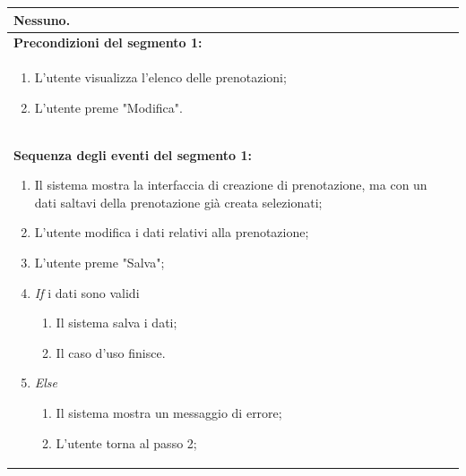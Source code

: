 \documentclass{article}
\begin{document}
\begin{table}[t]
\begin{tabular}{|p{\linewidth}|}
                        Nessuno. \\
                        \hline
                        \cellcolor{gray!20}
                        \textbf{Precondizioni del segmento 1:} \\
                        \cellcolor{gray!20}
                        \begin{minipage}{\linewidth}
                            \begin{enumerate}[noitemsep]
                                \item L'utente visualizza l'elenco delle prenotazioni;
                                \item L'utente preme "Modifica".
                            \end{enumerate}
                        \end{minipage}
                        \vspace{-5pt} \\
                        \hline
                        \textbf{Sequenza degli eventi del segmento 1:}
                        \begin{enumerate}
                            \item Il sistema mostra la interfaccia di creazione di prenotazione, ma con un dati saltavi della prenotazione già creata selezionati; %
                            \item L'utente modifica i dati relativi alla prenotazione;
                            \item L'utente preme "Salva";
                            \item \textit{If} i dati sono validi
                            \begin{enumerate}
                                \item Il sistema salva i dati;
                                \item Il caso d'uso finisce.
                            \end{enumerate}
                            \item \textit{Else}
                            \begin{enumerate}
                                \item Il sistema mostra un messaggio di errore;
                                \item L'utente torna al passo 2;
                            \end{enumerate}

\end{enumerate}
\end{tabular}
\end{table}
\end{document}
